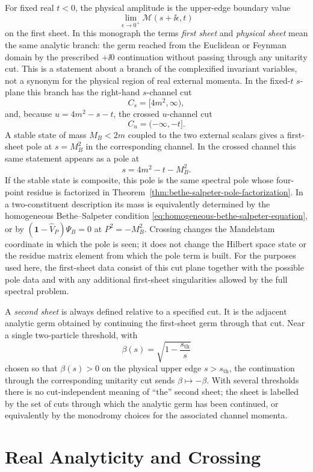 For fixed real \(t<0\), the physical amplitude is the upper-edge boundary
value
\[
  \lim_{\epsilon\to0^+}\mathcal M(s+\ii\epsilon,t)
\]
on the first sheet.  In this monograph the terms \emph{first sheet} and
\emph{physical sheet} mean the same analytic branch: the germ reached from the
Euclidean or Feynman domain by the prescribed \(+\ii0\) continuation without
passing through any unitarity cut.  This is a statement about a branch of the
complexified invariant variables, not a synonym for the physical region of real
external momenta.  In the fixed-\(t\) \(s\)-plane this branch has the right-hand
\(s\)-channel cut
\[
  C_s=[4m^2,\infty),
\]
and, because \(u=4m^2-s-t\), the crossed \(u\)-channel cut
\[
  C_u=(-\infty,-t] .
\]
A stable state of mass \(M_B<2m\) coupled to the two external scalars gives a
first-sheet pole at \(s=M_B^2\) in the corresponding channel.  In the crossed
channel this same statement appears as a pole at
\[
  s=4m^2-t-M_B^2 .
\]
If the stable state is composite, this pole is the same spectral pole whose
four-point residue is factorized in
Theorem~\ref{thm:bethe-salpeter-pole-factorization}.  In a two-constituent
description its mass is equivalently determined by the homogeneous
Bethe--Salpeter condition
\eqref{eq:homogeneous-bethe-salpeter-equation}, or by
\((\mathbf 1-\widehat V_P)\Psi_B=0\) at \(P^2=-M_B^2\).  Crossing changes the
Mandelstam coordinate in which the pole is seen; it does not change the Hilbert
space state or the residue matrix element from which the pole term is built.
For the purposes used here, the first-sheet data consist of this cut plane
together with the possible pole data and with any additional first-sheet
singularities allowed by the full spectral problem.

A \emph{second sheet} is always defined relative to a specified cut.  It is the
adjacent analytic germ obtained by continuing the first-sheet germ through that
cut.  Near a single two-particle threshold, with
\[
  \beta(s)=\sqrt{1-\frac{s_{\mathrm{th}}}{s}}
\]
chosen so that \(\beta(s)>0\) on the physical upper edge \(s>s_{\mathrm{th}}\),
the continuation through the corresponding unitarity cut sends
\(\beta\mapsto-\beta\).  With several thresholds there is no cut-independent
meaning of ``the'' second sheet; the sheet is labelled by the set of cuts
through which the analytic germ has been continued, or equivalently by the
monodromy choices for the associated channel momenta.

\section{Real Analyticity and Crossing}

